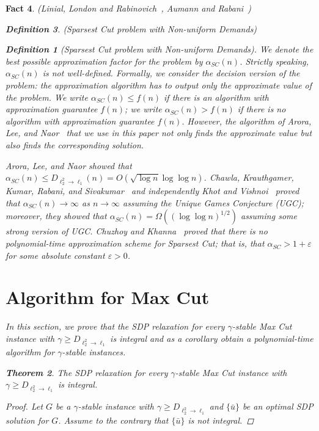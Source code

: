 \documentclass[twoside,leqno,twocolumn]{article}
\newtheorem{theorem}{Theorem}[section]
\newtheorem{Definition}[theorem]{Definition}
\newtheorem{fact}[theorem]{Fact}
\begin{document}
\begin{fact}{\sc (Linial, London and Rabinovich~\cite{LLR}, Aumann and Rabani~\cite{AR})}
\begin{Definition} {\sc (Sparsest Cut problem with Non-uniform Demands)}
\begin{Definition}[Sparsest Cut problem with Non-uniform Demands]
We denote the best possible approximation factor for the problem by $\alpha_{SC}(n)$. 
Strictly speaking, $\alpha_{SC}(n)$ is not well-defined. 
Formally, we consider the decision version of the problem: the approximation 
algorithm has to output only the approximate value of the problem. 
We write $\alpha_{SC}(n) \leq f(n)$ if there is an algorithm with approximation guarantee $f(n)$; we write $\alpha_{SC}(n) > f(n)$ if there is no algorithm with approximation guarantee $f(n)$. However, the algorithm of Arora, Lee, and Naor~\cite{ALN} that we use in this paper not only finds the approximate value but also finds the corresponding solution.
\end{Definition}

Arora, Lee, and Naor showed that $\alpha_{SC}(n) \leq D_{\ell_2^2\to \ell_1}(n) = O(\sqrt{\log n} \log\log n)$.
Chawla, Krauthgamer, Kumar, Rabani, and Sivakumar~\cite{CKKRS} and independently Khot and Vishnoi~\cite{KV}
proved that $\alpha_{SC}(n)\to\infty$ as $n\to \infty$ assuming the Unique Games Conjecture (UGC); moreover, they showed that $\alpha_{SC}(n) = \Omega((\log\log n)^{1/2})$ assuming some strong version of UGC.
Chuzhoy and Khanna~\cite{CK06} proved that there is no polynomial-time approximation scheme for Sparsest Cut; that is, that $\alpha_{SC} > 1 + \varepsilon$
for some absolute constant $\varepsilon > 0$.



\section{Algorithm for Max Cut} \label{sec:robustalgo}
In this section, we prove that the SDP relaxation for every $\gamma$-stable Max Cut instance with $\gamma \geq D_{\ell_2^2\to \ell_1}$
is integral and as a corollary obtain a polynomial-time algorithm for $\gamma$-stable instances.
  
\begin{theorem}\label{thm:sdp-integral}
The SDP relaxation for every $\gamma$-stable Max Cut instance with $\gamma \geq D_{\ell_2^2\to \ell_1}$
is integral.
\end{theorem}
\begin{proof}
Let $G$ be a $\gamma$-stable instance with $\gamma \geq D_{\ell_2^2\to \ell_1}$ and $\{\bar u\}$ be an optimal SDP solution 
for $G$. Assume to the contrary that $\{\bar u\}$ is not integral. 


\end{proof}
\end{Definition}
\end{fact}
\end{document}
